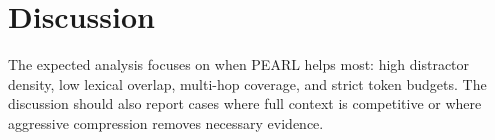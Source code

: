 \section{Discussion}

The expected analysis focuses on when PEARL helps most: high distractor density,
low lexical overlap, multi-hop coverage, and strict token budgets. The
discussion should also report cases where full context is competitive or where
aggressive compression removes necessary evidence.
